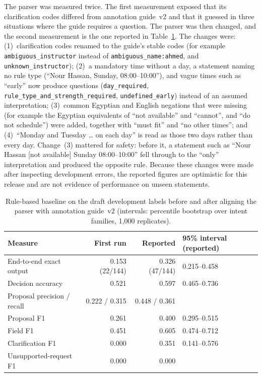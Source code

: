 The parser was measured twice. The first measurement exposed that its clarification codes differed from annotation guide~v2 and that it guessed in three situations where the guide requires a question. The parser was then changed, and the second measurement is the one reported in Table~\ref{tab:baseline}. The changes were: (1)~clarification codes renamed to the guide's stable codes (for example \texttt{ambiguous\_instructor} instead of \texttt{ambiguous\_name:ahmed}, and \texttt{unknown\_instructor}); (2)~a mandatory time without a day, a statement naming no rule type (``Nour Hassan, Sunday, 08:00--10:00''), and vague times such as ``early'' now produce questions (\texttt{day\_required}, \texttt{rule\_type\_and\_strength\_required}, \texttt{undefined\_early}) instead of an assumed interpretation; (3)~common Egyptian and English negations that were missing (for example the Egyptian equivalents of ``not available'' and ``cannot'', and ``do not schedule'') were added, together with ``must fit'' and ``no other times''; and (4)~``Monday and Tuesday \ldots{} on each day'' is read as those two days rather than every day. Change~(3) mattered for safety: before it, a statement such as ``Nour Hassan [not available] Sunday 08:00--10:00'' fell through to the ``only'' interpretation and produced the opposite rule. Because these changes were made after inspecting development errors, the reported figures are optimistic for this release and are not evidence of performance on unseen statements.

\begin{table}[h]
\centering
\small
\begin{tabular}{@{}lrrl@{}}
\toprule
Measure & First run & Reported & 95\% interval (reported) \\
\midrule
End-to-end exact output & 0.153 (22/144) & 0.326 (47/144) & 0.215--0.458 \\
Decision accuracy & 0.521 & 0.597 & 0.465--0.736 \\
Proposal precision / recall & 0.222 / 0.315 & 0.448 / 0.361 & \\
Proposal F1 & 0.261 & 0.400 & 0.295--0.515 \\
Field F1 & 0.451 & 0.605 & 0.474--0.712 \\
Clarification F1 & 0.000 & 0.351 & 0.141--0.576 \\
Unsupported-request F1 & 0.000 & 0.000 & \\
\bottomrule
\end{tabular}
\caption{Rule-based baseline on the draft development labels before and after aligning the parser with annotation guide~v2 (intervals: percentile bootstrap over intent families, 1{,}000 replicates).}
\label{tab:baseline}
\end{table}


